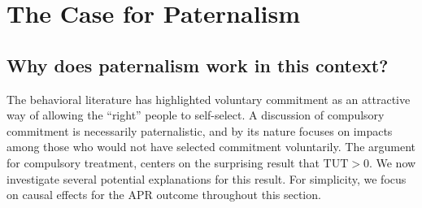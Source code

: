 \documentclass[oneside,11pt]{article}
\begin{document}




\section{The Case for Paternalism}
\label{Paternalism}

\subsection{Why does paternalism work in this context?}
\label{why_paternalism}

The behavioral literature has highlighted voluntary commitment as an attractive way of allowing the ``right'' people to self-select. A discussion of compulsory commitment is necessarily paternalistic, and by its nature focuses on impacts among those who would not have selected commitment voluntarily. 
The argument for compulsory treatment, centers on the surprising result that $\text{TUT}>0$. We now investigate several potential explanations for this result.
For simplicity, we focus on causal effects for the APR outcome throughout this section.
\end{document}
